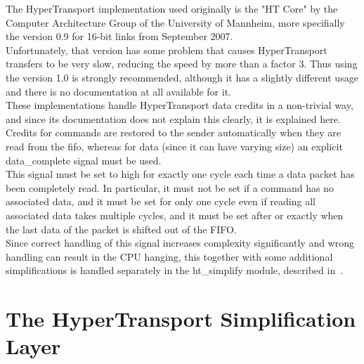 The HyperTransport implementation used originally is the "HT Core" by the Computer
Architecture Group of the University of Mannheim, more specifially the
version 0.9 for 16-bit links from September 2007.\\
Unfortunately, that version has some problem that causes HyperTransport
transfers to be very slow, reducing the speed by more than a factor 3.
Thus using the version 1.0 is strongly recommended, although it has
a slightly different usage and there is no documentation at all available
for it.\\
These implementations handle HyperTransport data credits in a non-trivial
way, and since its documentation does not explain this clearly, it is
explained here.\\
Credits for commands are restored to the sender automatically when they are
read from the fifo, whereas for data (since it can have varying size) an
explicit data\_complete signal must be used.\\
This signal must be set to high for exactly one cycle each time a data packet
has been completely read. In particular, it must not be set if a command
has no associated data, and it must be set for only one cycle even if reading
all associated data takes multiple cycles, and it must be set after or
exactly when the last data of the packet is shifted out of the FIFO.\\
Since correct handling of this signal increases complexity significantly
and wrong handling can result in the CPU hanging, this together with some
additional simplifications is handled separately in the ht\_simplify module,
described in~.

\section{The HyperTransport Simplification Layer}
\label{sec:htsimplify}

